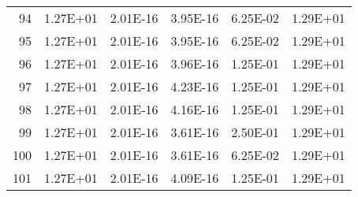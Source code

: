 \documentclass[12pt]{article}
\begin{document}
\begin{table}[htbp]
\begin{tabular}{rrrrrr}
    94    & 1.27E+01 & 2.01E-16 & 3.95E-16 & 6.25E-02 & 1.29E+01 \\
    95    & 1.27E+01 & 2.01E-16 & 3.95E-16 & 6.25E-02 & 1.29E+01 \\
    96    & 1.27E+01 & 2.01E-16 & 3.96E-16 & 1.25E-01 & 1.29E+01 \\
    97    & 1.27E+01 & 2.01E-16 & 4.23E-16 & 1.25E-01 & 1.29E+01 \\
    98    & 1.27E+01 & 2.01E-16 & 4.16E-16 & 1.25E-01 & 1.29E+01 \\
    99    & 1.27E+01 & 2.01E-16 & 3.61E-16 & 2.50E-01 & 1.29E+01 \\
    100   & 1.27E+01 & 2.01E-16 & 3.61E-16 & 6.25E-02 & 1.29E+01 \\
    101   & 1.27E+01 & 2.01E-16 & 4.09E-16 & 1.25E-01 & 1.29E+01 \\
    \bottomrule
    \end{tabular}%
  \label{tab:addlabel}%
\end{table}%
 
 
\pagebreak
\end{document}
